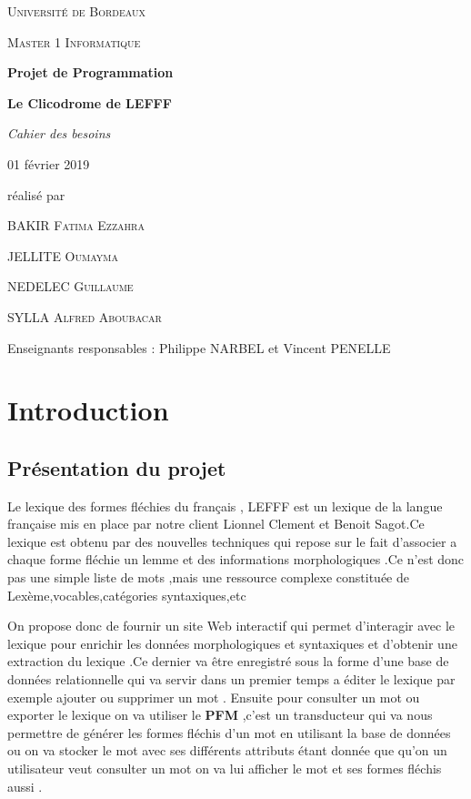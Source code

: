 \documentclass[12pt,a4paper]{article}
\begin{document}
\begin{titlepage}
\centering
{\scshape\LARGE Université de Bordeaux \par}
{\scshape\Large Master 1 Informatique  \par}
\vspace{3cm}

{\Huge\bfseries Projet de Programmation\par}
{\Huge\bfseries Le Clicodrome de LEFFF \par}
\vspace{0.5cm}
{\Large\itshape Cahier des besoins\par}
{\large 01 février 2019\par}

\vfill
réalisé par \par
BAKIR \textsc{Fatima Ezzahra} \par
JELLITE \textsc{Oumayma} \par
NEDELEC \textsc{Guillaume} \par
SYLLA  \textsc{Alfred Aboubacar} \par
\vfill

{\large Enseignants responsables : Philippe NARBEL et Vincent PENELLE\par}

\end{titlepage}

\tableofcontents

\newpage\section{Introduction}

\subsection{Présentation du projet}


\smallbreak
Le lexique des formes fléchies du français , LEFFF est un lexique de la langue française mis en place par notre client Lionnel Clement et Benoit Sagot.Ce lexique est obtenu par des nouvelles techniques qui repose sur le fait d'associer a chaque forme fléchie un lemme et des informations morphologiques .Ce n'est donc pas une simple liste de mots ,mais une ressource complexe constituée de Lexème,vocables,catégories syntaxiques,etc

 On propose donc de fournir un site Web interactif qui permet d'interagir avec le lexique pour enrichir les données morphologiques et syntaxiques et d'obtenir une extraction du lexique .Ce dernier va être enregistré sous la forme d'une base de données relationnelle qui va servir dans un premier temps a éditer le lexique par exemple ajouter ou supprimer un mot . Ensuite pour consulter un mot ou exporter le lexique on va utiliser le \textbf{PFM} ,c'est un transducteur qui va nous permettre de générer les formes fléchis d'un mot en utilisant la base de données ou on va stocker le mot avec ses différents attributs étant donnée que qu'on un utilisateur veut consulter un mot on va lui afficher le mot et ses formes fléchis aussi .
\end{document}
